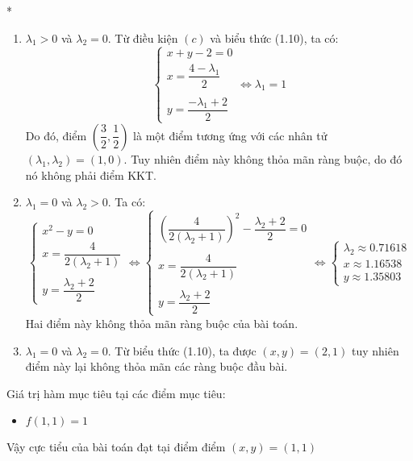 \begin{solution}{*}
\begin{enumerate}[label=(\roman*)]
        \item $\lambda_1 > 0$ và $\lambda_2 = 0$. Từ điều kiện $(c)$ và biểu thức (1.10), ta có:
        \begin{equation}
            \begin{cases}
                x + y - 2 = 0 \\
                x = \dfrac{4-\lambda_1}{2}\\\\
                y = \dfrac{- \lambda_1 + 2}{2}
            \end{cases}
            \Leftrightarrow \lambda_1 = 1
        \end{equation}
        Do đó, điểm $\left(\dfrac{3}{2},\dfrac{1}{2}\right)$ là một điểm tương ứng với các nhân tử $(\lambda_1, \lambda_2) = (1, 0)$. Tuy nhiên điểm này không thỏa mãn ràng buộc, do đó nó không phải điểm KKT.
        \item $\lambda_1 = 0$ và $\lambda_2 > 0$. Ta có:
        \begin{equation}
            \begin{cases}
                x^2 - y = 0\\
                x = \dfrac{4}{2(\lambda_2 + 1)}\\\\
                y = \dfrac{\lambda_2 + 2}{2}
            \end{cases}
            \Leftrightarrow 
            \begin{cases}
                \left( \dfrac{4}{2(\lambda_2 + 1)}\right)^2 - \dfrac{\lambda_2 + 2}{2} = 0\\\\
                x = \dfrac{4}{2(\lambda_2 + 1)}\\\\
                y = \dfrac{\lambda_2 + 2}{2}
            \end{cases}
            \Leftrightarrow 
            \begin{cases}
                \lambda_2 \approx 0.71618\\
                x \approx 1.16538 \\
                y \approx 1.35803
            \end{cases}
        \end{equation}
        Hai điểm này không thỏa mãn ràng buộc của bài toán.
        \item $\lambda_1 = 0$ và $\lambda_2 = 0$. Từ biểu thức (1.10), ta được $(x, y) = (2, 1)$ tuy nhiên điểm này lại không thỏa mãn các ràng buộc đầu bài.
    \end{enumerate}
    Giá trị hàm mục tiêu tại các điểm mục tiêu:
    \begin{itemize}
        \item $f(1,1) = 1$
    \end{itemize}
    Vậy cực tiểu của bài toán đạt tại điểm điểm $(x, y) = (1,1)$
\end{solution}